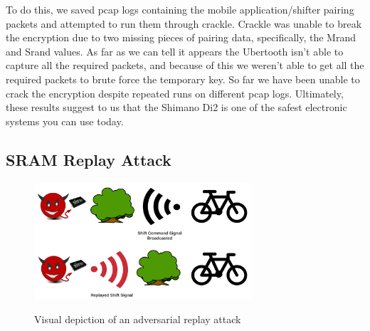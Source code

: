 \documentclass[letterpaper,twocolumn,10pt]{article}
\begin{document}
To do this, we saved pcap logs containing the mobile application/shifter pairing packets and attempted to run them through crackle. Crackle was unable to break the encryption due to two missing pieces of pairing data, specifically, the Mrand and Srand values. As far as we can tell it appears the Ubertooth isn't able to capture all the required packets, and because of this we weren't able to get all the required packets to brute force the temporary key. So far we have been unable to crack the encryption despite repeated runs on different pcap logs. Ultimately, these results suggest to us that the Shimano Di2 is one of the safest electronic systems you can use today.

\subsection{SRAM Replay Attack}

\begin{figure}[ht]
  \begin{center}
    \centering
    \includegraphics[width=230pt]{images/replay.png}
    \label{fig:Replay}
  \end{center}
  \caption{Visual depiction of an adversarial replay attack}
\end{figure}
\end{document}

